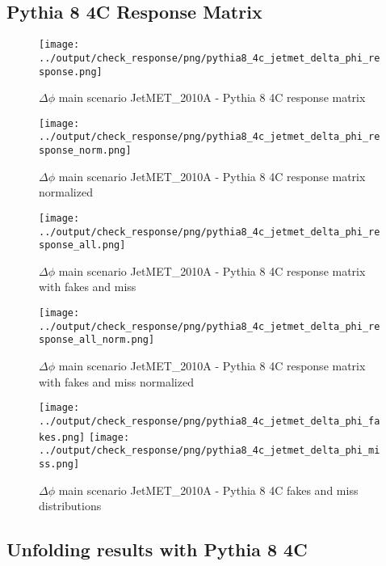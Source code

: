 \documentclass[11pt]{book}
\begin{document}
\clearpage
\subsection{Pythia 8 4C Response Matrix}

\begin{figure}[ht]
\centering
\texttt{[image: ../output/check\_response/png/pythia8\_4c\_jetmet\_delta\_phi\_response.png]}
\caption{$\Delta\phi$ main scenario JetMET\_2010A - Pythia 8 4C response matrix}
\label{p8_jetmet_delta_phi_response}
\end{figure}

\begin{figure}[ht]
\centering
\texttt{[image: ../output/check\_response/png/pythia8\_4c\_jetmet\_delta\_phi\_response\_norm.png]}
\caption{$\Delta\phi$ main scenario JetMET\_2010A - Pythia 8 4C response matrix normalized}
\label{p8_jetmet_delta_phi_response_norm}
\end{figure}

\begin{figure}[ht]
\centering
\texttt{[image: ../output/check\_response/png/pythia8\_4c\_jetmet\_delta\_phi\_response\_all.png]}
\caption{$\Delta\phi$ main scenario JetMET\_2010A - Pythia 8 4C response matrix with fakes and miss}
\label{p8_jetmet_delta_phi_response_all}
\end{figure}

\begin{figure}[ht]
\centering
\texttt{[image: ../output/check\_response/png/pythia8\_4c\_jetmet\_delta\_phi\_response\_all\_norm.png]}
\caption{$\Delta\phi$ main scenario JetMET\_2010A - Pythia 8 4C response matrix with fakes and miss normalized}
\label{p8_jetmet_delta_phi_response_all_norm}
\end{figure}

\begin{figure}[ht]
\centering
\texttt{[image: ../output/check\_response/png/pythia8\_4c\_jetmet\_delta\_phi\_fakes.png]}
\texttt{[image: ../output/check\_response/png/pythia8\_4c\_jetmet\_delta\_phi\_miss.png]}
\caption{$\Delta\phi$ main scenario JetMET\_2010A - Pythia 8 4C fakes and miss distributions}
\label{p8_jetmet_delta_phi_fakesmiss}
\end{figure}

\clearpage
\subsection{Unfolding results with Pythia 8 4C}
\end{document}
